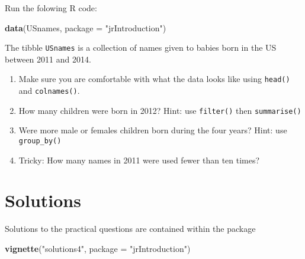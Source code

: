 \documentclass[]{tufte-handout}
\newenvironment{Shaded}{}{}
\newcommand{\DataTypeTok}[1]{\textcolor[rgb]{0.56,0.13,0.00}{#1}}
\newcommand{\KeywordTok}[1]{\textcolor[rgb]{0.00,0.44,0.13}{\textbf{#1}}}
\newcommand{\NormalTok}[1]{#1}
\newcommand{\StringTok}[1]{\textcolor[rgb]{0.25,0.44,0.63}{#1}}
\begin{document}
Run the folowing R code:

\begin{Shaded}
\begin{Highlighting}[]
\KeywordTok{data}\NormalTok{(USnames, }\DataTypeTok{package =} \StringTok{"jrIntroduction"}\NormalTok{)}
\end{Highlighting}
\end{Shaded}

\noindent The tibble \texttt{USnames} is a collection of names given to
babies born in the US between 2011 and 2014.

\begin{enumerate}
\def\labelenumi{\arabic{enumi}.}
\item
  Make sure you are comfortable with what the data looks like using
  \texttt{head()} and \texttt{colnames()}.
\item
  How many children were born in 2012? Hint: use \texttt{filter()} then
  \texttt{summarise()}
\item
  Were more male or females children born during the four years? Hint:
  use \texttt{group\_by()}
\item
  Tricky: How many names in 2011 were used fewer than ten times?
\end{enumerate}

\hypertarget{solutions}{%
\section{Solutions}\label{solutions}}

Solutions to the practical questions are contained within the package

\begin{Shaded}
\begin{Highlighting}[]
\KeywordTok{vignette}\NormalTok{(}\StringTok{"solutions4"}\NormalTok{, }\DataTypeTok{package =} \StringTok{"jrIntroduction"}\NormalTok{)}
\end{Highlighting}
\end{Shaded}
\end{document}
